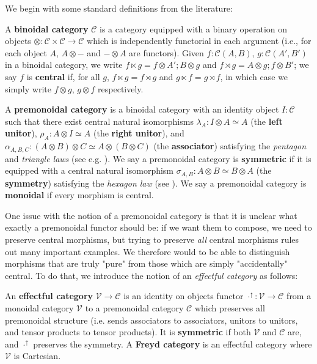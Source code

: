 \documentclass[acmsmall,screen,review]{acmart}
\newcommand{\mc}[1]{\ensuremath{\mathcal{#1}}}
\newcommand{\upg}[2]{{#1}^{\uparrow #2}}
\begin{document}
We begin with some standard definitions from the literature:
\begin{definition} 
  A \textbf{binoidal category} \(\mc{C}\) is a category equipped with a binary
  operation on objects \(\otimes: \mc{C} \times \mc{C} \to \mc{C}\) which is
  independently functorial in each argument (i.e., for each object \(A\), \(A
  \otimes -\) and \(- \otimes A\) are functors). 
  Given \(f: \mc{C}(A, B)\), \(g: \mc{C}(A', B')\) in a binoidal category, we
  write \(f \ltimes g = f \otimes A';B \otimes g\) and \(f \rtimes g = A \otimes
  g;f \otimes B'\); we say \(f\) is \textbf{central} if, for all \(g\), \(f
  \ltimes g = f \rtimes g\) and \(g \ltimes f = g \rtimes f\), in which case we
  simply write \(f \otimes g\), \(g \otimes f\) respectively.
\end{definition}
\begin{definition} 
  A \textbf{premonoidal category} is a binoidal category with an identity object
  \(I: \mc{C}\) such that there exist central natural isomorphisms \(\lambda_A:
  I \otimes A \simeq A\) (the \textbf{left unitor}), \(\rho_A: A \otimes I
  \simeq A\) (the \textbf{right unitor}), and \(\alpha_{A, B, C}: (A \otimes B)
  \otimes C \simeq A \otimes (B \otimes C)\) (the \textbf{associator})
  satisfying the \textit{pentagon} and \textit{triangle laws} (see e.g.
  \citet{maclane:71}). We say a premonoidal category is \textbf{symmetric} if it
  is equipped with a central natural isomorphism \(\sigma_{A, B}: A \otimes B
  \simeq B \otimes A\) (the \textbf{symmetry}) satisfying the \textit{hexagon
  law} (see \cite{maclane:71}). We say a premonoidal category is
  \textbf{monoidal} if every morphism is central.
\end{definition}
One issue with the notion of a premonoidal category is that it is unclear what
exactly a premonoidal functor should be: if we want them to compose, we need to
preserve central morphisms, but trying to preserve \textit{all} central
morphisms rules out many important examples. We therefore would to be able to
distinguish morphisms that are truly "pure" from those which are simply
"accidentally" central. To do that, we introduce the notion of an
\textit{effectful category} as follows:
\begin{definition} 
  An \textbf{effectful category} \(\mc{V} \to \mc{C}\) is an identity on objects
  functor \(\upg{\cdot}{}: \mc{V} \to \mc{C}\) from a monoidal category
  \(\mc{V}\) to a premonoidal category \(\mc{C}\) which preserves all
  premonoidal structure (i.e. sends associators to associators, unitors to
  unitors, and tensor products to tensor products). It is \textbf{symmetric} if
  both \(\mc{V}\) and \(\mc{C}\) are, and \(\upg{\cdot}{}\) preserves the
  symmetry. A \textbf{Freyd category} is an effectful category where \(\mc{V}\)
  is Cartesian.
\end{definition}
\end{document}
